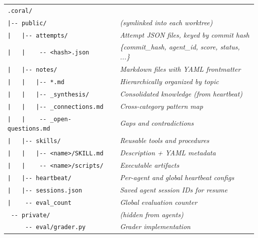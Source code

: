 \begin{promptbox}
\ttfamily\scriptsize
\begin{tabular}{@{}l@{\quad}l@{}}
\texttt{.coral/} & \\
\texttt{|{-}{-} public/} & \textit{(symlinked into each worktree)} \\
\texttt{|~~~|{-}{-} attempts/} & \textit{Attempt JSON files, keyed by commit hash} \\
\texttt{|~~~|~~~~{-}{-} \textrm{\textless}hash\textrm{\textgreater}.json} & \textit{\{commit\_hash, agent\_id, score, status, ...\}} \\
\texttt{|~~~|{-}{-} notes/} & \textit{Markdown files with YAML frontmatter} \\
\texttt{|~~~|~~~|{-}{-} *.md} & \textit{Hierarchically organized by topic} \\
\texttt{|~~~|~~~|{-}{-} \_synthesis/} & \textit{Consolidated knowledge (from heartbeat)} \\
\texttt{|~~~|~~~|{-}{-} \_connections.md} & \textit{Cross-category pattern map} \\
\texttt{|~~~|~~~~{-}{-} \_open-questions.md} & \textit{Gaps and contradictions} \\
\texttt{|~~~|{-}{-} skills/} & \textit{Reusable tools and procedures} \\
\texttt{|~~~|~~~|{-}{-} \textrm{\textless}name\textrm{\textgreater}/SKILL.md} & \textit{Description + YAML metadata} \\
\texttt{|~~~|~~~~{-}{-} \textrm{\textless}name\textrm{\textgreater}/scripts/} & \textit{Executable artifacts} \\
\texttt{|~~~|{-}{-} heartbeat/} & \textit{Per-agent and global heartbeat configs} \\
\texttt{|~~~|{-}{-} sessions.json} & \textit{Saved agent session IDs for resume} \\
\texttt{|~~~~{-}{-} eval\_count} & \textit{Global evaluation counter} \\
\texttt{~{-}{-} private/} & \textit{(hidden from agents)} \\
\texttt{~~~~~{-}{-} eval/grader.py} & \textit{Grader implementation} \\
\end{tabular}
\end{promptbox}

